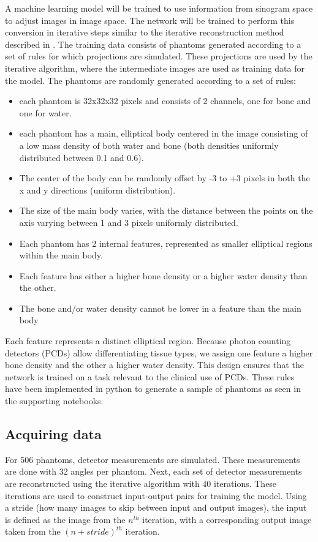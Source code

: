 \documentclass{article}
\begin{document}
A machine learning model will be trained to use information from sinogram space to adjust images in image space. The network will be trained to perform this conversion in iterative steps similar to the iterative reconstruction method described in \citep{mechlem2018joint}. The training data consists of phantoms generated according to a set of rules for which projections are simulated. These projections are used by the iterative algorithm, where the intermediate images are used as training data for the model. The phantoms are randomly generated according to a set of rules:

\begin{itemize}
\item each phantom is 32x32x32 pixels and consists of 2 channels, one for bone and one for water.
\item each phantom has a main, elliptical body centered in the image consisting of a low mass density of both water and bone (both densities uniformly distributed between 0.1 and 0.6).
\item The center of the body can be randomly offset by -3 to +3 pixels in both the x and y directions (uniform distribution).
\item The size of the main body varies, with the distance between the points on the axis varying between 1 and 3 pixels uniformly distributed.
\item Each phantom has 2 internal features, represented as smaller elliptical regions within the main body.
\item Each feature has either a higher bone density or a higher water density than the other.
\item The bone and/or water density cannot be lower in a feature than the main body
\end{itemize}

Each feature represents a distinct elliptical region. Because photon counting detectors (PCDs) allow differentiating tissue types, we assign one feature a higher bone density and the other a higher water density. This design ensures that the network is trained on a task relevant to the clinical use of PCDs. These rules have been implemented in python to generate a sample of phantoms as seen in the supporting notebooks.

\subsection{Acquiring data}

For 506 phantoms, detector measurements are simulated. These measurements are done with 32 angles per phantom. Next, each set of detector measurements are reconstructed using the iterative algorithm with 40 iterations. These iterations are used to construct input-output pairs for training the model. Using a stride (how many images to skip between input and output images), the input is defined as the image from the $n^{th}$ iteration, with a corresponding output image taken from the $(n+stride)^{th}$ iteration.
\end{document}
